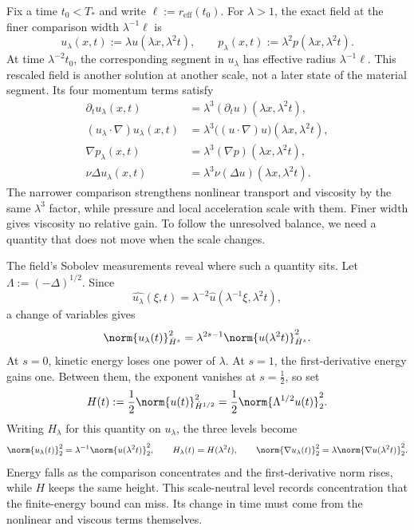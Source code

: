 
Fix a time \(t_0<T_*\) and write \(\ell:=r_{\mathrm{eff}}(t_0)\). For \(\lambda>1\), the exact \NavierStokes{} field at the finer comparison width \(\lambda^{-1}\ell\) is
\[
  u_\lambda(x,t)
  :=
  \lambda u(\lambda x,\lambda^2t),
  \qquad
  p_\lambda(x,t)
  :=
  \lambda^2p(\lambda x,\lambda^2t).
\]
At time \(\lambda^{-2}t_0\), the corresponding segment in \(u_\lambda\) has effective radius \(\lambda^{-1}\ell\). This rescaled field is another solution at another scale, not a later state of the material segment. Its four momentum terms satisfy
\[
\begin{aligned}
  \partial_tu_\lambda(x,t)
  &=
  \lambda^3(\partial_tu)(\lambda x,\lambda^2t),
  \\
  (u_\lambda\cdot\nabla)u_\lambda(x,t)
  &=
  \lambda^3\bigl((u\cdot\nabla)u\bigr)(\lambda x,\lambda^2t),
  \\
  \nabla p_\lambda(x,t)
  &=
  \lambda^3(\nabla p)(\lambda x,\lambda^2t),
  \\
  \nu\Delta u_\lambda(x,t)
  &=
  \lambda^3\nu(\Delta u)(\lambda x,\lambda^2t).
\end{aligned}
\]
The narrower comparison strengthens nonlinear transport and viscosity by the same \(\lambda^3\) factor, while pressure and local acceleration scale with them. Finer width gives viscosity no relative gain. To follow the unresolved balance, we need a quantity that does not move when the scale changes.


The field's Sobolev measurements reveal where such a quantity sits. Let \(\Lambda:=(-\Delta)^{1/2}\). Since
\[
  \widehat{u_\lambda}(\xi,t)
  =
  \lambda^{-2}\widehat u(\lambda^{-1}\xi,\lambda^2t),
\]
a change of variables gives
\[
  \norm{u_\lambda(t)}_{\dot H^s}^2
  =
  \lambda^{2s-1}
  \norm{u(\lambda^2t)}_{\dot H^s}^2.
\]
At \(s=0\), kinetic energy loses one power of \(\lambda\). At \(s=1\), the first-derivative energy gains one. Between them, the exponent vanishes at \(s=\tfrac12\), so set
\[
  H(t)
  :=
  \frac12\norm{u(t)}_{\dot H^{1/2}}^2
  =
  \frac12\norm{\Lambda^{1/2}u(t)}_2^2.
\]
Writing \(H_\lambda\) for this quantity on \(u_\lambda\), the three levels become
\[
  \norm{u_\lambda(t)}_2^2
  =
  \lambda^{-1}\norm{u(\lambda^2t)}_2^2,
  \qquad
  H_\lambda(t)=H(\lambda^2t),
  \qquad
  \norm{\nabla u_\lambda(t)}_2^2
  =
  \lambda\norm{\nabla u(\lambda^2t)}_2^2.
\]
Energy falls as the comparison concentrates and the first-derivative norm rises, while \(H\) keeps the same height. This scale-neutral level records concentration that the finite-energy bound can miss. Its change in time must come from the nonlinear and viscous terms themselves.

